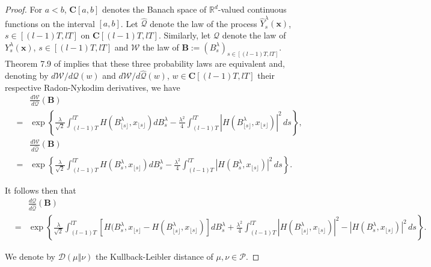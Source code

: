 \documentclass[a4paper,draft]{article}
\begin{document}
\begin{proof}
For $a<b$, $\mathbf{C}[a,b]$ denotes the Banach space of $\mathbb{R}^d$-valued
continuous functions on the interval $[a,b]$.
Let $\hat{\mathcal{Q}}$ denote the law of the process $\hat{Y}^{\lambda}_s(\mathbf{x})$, $s\in [(l-1)T,lT]$ on $\mathbf{C}[(l-1)T,lT]$.
Similarly, let $\mathcal{Q}$ denote the law of $Y_s^{\lambda}(\mathbf{x})$, $s\in [(l-1)T,lT]$ and
$\mathcal{W}$ the law of $\mathbf{B}:=(B^{\lambda}_s)_{s\in [(l-1)T,lT]}$. Theorem 7.9 of \cite{ls} implies that these three
probability laws are equivalent and, denoting by $d\mathcal{W}/d\mathcal{Q}(w)$ and
$d\mathcal{W}/d\hat{\mathcal{Q}}(w)$, $w\in\mathbf{C}[(l-1)T,lT]$ their respective
Radon-Nykodim derivatives, we have
\begin{eqnarray*}
& &\frac{d\mathcal{W}}{d\mathcal{Q}}(\mathbf{B})\\
&=& \exp\left\{\frac{\lambda}{\sqrt{2}}\int_{(l-1)T}^{lT} H(B^{\lambda}_{\lfloor s\rfloor},x_{\lfloor s\rfloor})
d{B}^{\lambda}_{s}
-\frac{\lambda^2}{4}\int_{(l-1)T}^{lT}
|H(B^{\lambda}_{\lfloor s\rfloor},x_{\lfloor s\rfloor})|^2\, ds\right\},\\
& &\frac{d\mathcal{W}}{d\hat{\mathcal{Q}}}(\mathbf{B})\\
&=& \exp\left\{\frac{\lambda}{\sqrt{2}}\int_{(l-1)T}^{lT} H(B^{\lambda}_s,x_{\lfloor s\rfloor})d{B}^{\lambda}_{s}
-\frac{\lambda^2}{4}\int_{(l-1)T}^{lT} |H(B^{\lambda}_s,x_{\lfloor s\rfloor})|^2
\, ds\right\}.
\end{eqnarray*}

It follows then that
\begin{eqnarray}\label{dian}
& &\frac{d\mathcal{Q}}{d\hat{\mathcal{Q}}}(\mathbf{B})\\
\nonumber &=& \exp\left\{\frac{\lambda}{\sqrt{2}}\int_{(l-1)T}^{lT} [H(B^{\lambda}_s,x_{\lfloor s\rfloor}-
H(B^{\lambda}_{\lfloor s\rfloor},x_{\lfloor s\rfloor})]d{B}^{\lambda}_{s}
+\frac{\lambda^2}{4}\int_{(l-1)T}^{lT}
|H(B^{\lambda}_{\lfloor s\rfloor},x_{\lfloor s\rfloor})|^2-|H(B^{\lambda}_s,x_{\lfloor s\rfloor})|^2\, ds\right\}.
\end{eqnarray}

We denote by $\mathcal{D}(\mu \Vert \nu)$
the Kullback-Leibler distance of $\mu,\nu\in\mathcal{P}$.


\end{proof}
\end{document}
